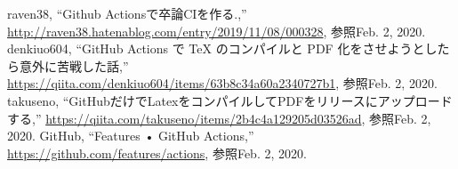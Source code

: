 \begin{thebibliography}{99}
 raven38, ``Github Actionsで卒論CIを作る.,'' \url{http://raven38.hatenablog.com/entry/2019/11/08/000328}, 参照Feb. 2, 2020.
 denkiuo604, ``GitHub Actions で TeX のコンパイルと PDF 化をさせようとしたら意外に苦戦した話,'' \url{https://qiita.com/denkiuo604/items/63b8c34a60a2340727b1}, 参照Feb. 2, 2020.
 takuseno, ``GitHubだけでLatexをコンパイルしてPDFをリリースにアップロードする,'' \url{https://qiita.com/takuseno/items/2b4c4a129205d03526ad}, 参照Feb. 2, 2020.
 GitHub, ``Features • GitHub Actions,'' \url{https://github.com/features/actions}, 参照Feb. 2, 2020.
\end{thebibliography}
